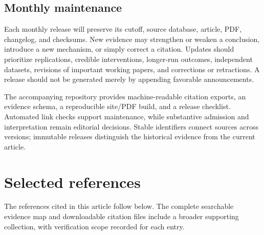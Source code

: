 \subsection*{Monthly maintenance}
Each monthly release will preserve its cutoff, source database, article, PDF, changelog, and checksums. New evidence may strengthen or weaken a conclusion, introduce a new mechanism, or simply correct a citation. Updates should prioritize replications, credible interventions, longer-run outcomes, independent datasets, revisions of important working papers, and corrections or retractions. A release should not be generated merely by appending favorable announcements.


The accompanying repository provides machine-readable citation exports, an evidence schema, a reproducible site/PDF build, and a release checklist. Automated link checks support maintenance, while substantive admission and interpretation remain editorial decisions. Stable identifiers connect sources across versions; immutable releases distinguish the historical evidence from the current article.



\section*{Selected references}
The references cited in this article follow below. The complete searchable evidence map and downloadable citation files include a broader supporting collection, with verification scope recorded for each entry.


